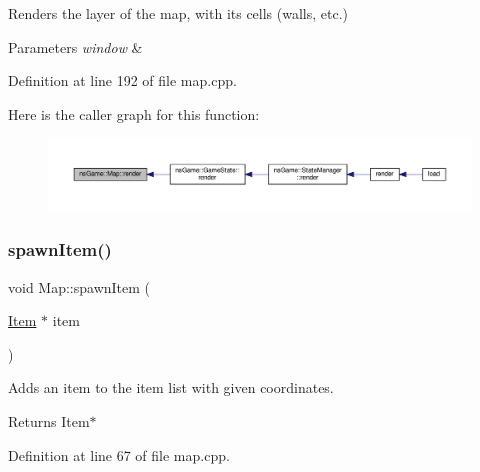 Renders the layer of the map, with its cells (walls, etc.) 


\begin{DoxyParams}{Parameters}
{\em window} & \\
\hline
\end{DoxyParams}


Definition at line 192 of file map.\+cpp.

Here is the caller graph for this function\+:\nopagebreak
\begin{figure}[H]
\begin{center}
\leavevmode
\includegraphics[width=350pt]{classns_game_1_1_map_a3660d6272f910c1b702c4e8f3f463f2b_icgraph}
\end{center}
\end{figure}
\mbox{\label{classns_game_1_1_map_a7197e3e471d8a827ad195e74707f4052}} 
\subsubsection{\texorpdfstring{spawn\+Item()}{spawnItem()}}
{\footnotesize\ttfamily void Map\+::spawn\+Item (\begin{DoxyParamCaption}\item[{\hyperlink{structns_game_1_1_item}{Item} $\ast$}]{item }\end{DoxyParamCaption})}



Adds an item to the item list with given coordinates. 

\begin{DoxyReturn}{Returns}
Item$\ast$ 
\end{DoxyReturn}


Definition at line 67 of file map.\+cpp.

